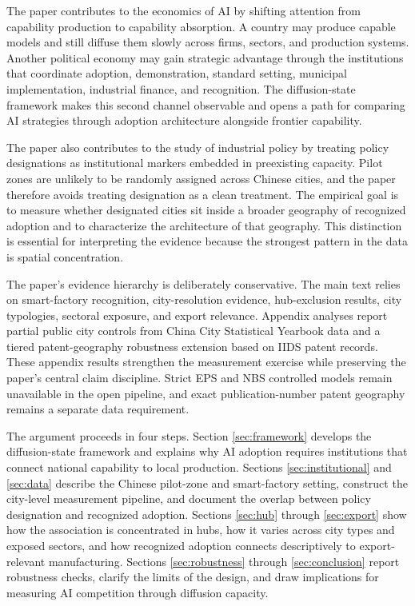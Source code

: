 \documentclass[12pt]{article}
\begin{document}
The paper contributes to the economics of AI by shifting attention from capability production to capability absorption. A country may produce capable models and still diffuse them slowly across firms, sectors, and production systems. Another political economy may gain strategic advantage through the institutions that coordinate adoption, demonstration, standard setting, municipal implementation, industrial finance, and recognition. The diffusion-state framework makes this second channel observable and opens a path for comparing AI strategies through adoption architecture alongside frontier capability.

The paper also contributes to the study of industrial policy by treating policy designations as institutional markers embedded in preexisting capacity. Pilot zones are unlikely to be randomly assigned across Chinese cities, and the paper therefore avoids treating designation as a clean treatment. The empirical goal is to measure whether designated cities sit inside a broader geography of recognized adoption and to characterize the architecture of that geography. This distinction is essential for interpreting the evidence because the strongest pattern in the data is spatial concentration.

The paper's evidence hierarchy is deliberately conservative. The main text relies on smart-factory recognition, city-resolution evidence, hub-exclusion results, city typologies, sectoral exposure, and export relevance. Appendix analyses report partial public city controls from China City Statistical Yearbook data and a tiered patent-geography robustness extension based on IIDS patent records. These appendix results strengthen the measurement exercise while preserving the paper's central claim discipline. Strict EPS and NBS controlled models remain unavailable in the open pipeline, and exact publication-number patent geography remains a separate data requirement.

The argument proceeds in four steps. Section \ref{sec:framework} develops the diffusion-state framework and explains why AI adoption requires institutions that connect national capability to local production. Sections \ref{sec:institutional} and \ref{sec:data} describe the Chinese pilot-zone and smart-factory setting, construct the city-level measurement pipeline, and document the overlap between policy designation and recognized adoption. Sections \ref{sec:hub} through \ref{sec:export} show how the association is concentrated in hubs, how it varies across city types and exposed sectors, and how recognized adoption connects descriptively to export-relevant manufacturing. Sections \ref{sec:robustness} through \ref{sec:conclusion} report robustness checks, clarify the limits of the design, and draw implications for measuring AI competition through diffusion capacity.
\end{document}
